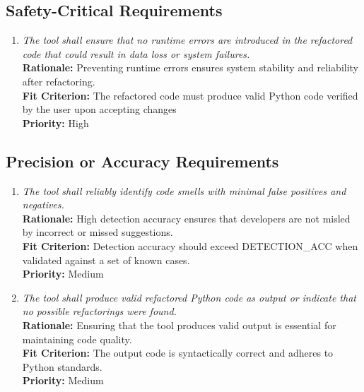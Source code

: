 \documentclass[12pt]{article}
\begin{document}
\subsection{Safety-Critical Requirements}
\begin{enumerate}[label=PR-SCR \arabic*., wide=0pt, leftmargin=*]
  \item \emph{The tool shall ensure that no runtime errors are
      introduced in the refactored code that could result in data loss
    or system failures.}\\[2mm]
    {\bf Rationale:} Preventing runtime errors ensures system
    stability and reliability after refactoring.\\
    {\bf Fit Criterion:} The refactored code must produce valid Python code verified by the user upon accepting changes\\
    {\bf Priority:} High
\end{enumerate}
\subsection{Precision or Accuracy Requirements}
\begin{enumerate}[label=PR-PAR \arabic*., wide=0pt, leftmargin=*]
  \item \emph{The tool shall reliably identify code smells with
    minimal false positives and negatives.}\\[2mm]
    {\bf Rationale:} High detection accuracy ensures that developers
    are not misled by incorrect or missed suggestions.\\
    {\bf Fit Criterion:} Detection accuracy should exceed
    DETECTION\_ACC when validated against a set of known cases.\\
    {\bf Priority:} Medium
  \item \emph{The tool shall produce valid refactored Python code as
    output or indicate that no possible refactorings were found.}\\[2mm]
    {\bf Rationale:} Ensuring that the tool produces valid output is
    essential for maintaining code quality.\\
    {\bf Fit Criterion:} The output code is syntactically correct and
    adheres to Python standards.\\
    {\bf Priority:} Medium
\end{enumerate}
\end{document}

